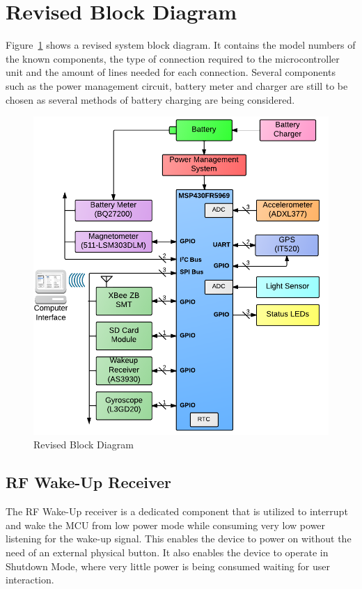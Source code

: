 \section{Revised Block Diagram}

Figure~\ref{fig:blockDiagram} shows a revised system block diagram.  It contains the model numbers of the known components, the type of connection required to the microcontroller unit and the amount of lines needed for each connection.  Several components such as the power management circuit, battery meter and charger are still to be chosen as several methods of battery charging are being considered.

\begin{figure}[H]
	\centering
	\includegraphics[width=\textwidth]{img/blockDiagramV2_2}
	\caption{Revised Block Diagram \label{fig:blockDiagram}}
\end{figure}

\subsection{RF Wake-Up Receiver}
The RF Wake-Up receiver is a dedicated component that is utilized to interrupt and wake the MCU from low power mode while consuming very low power listening for the wake-up signal. This enables the device to power on without the need of an external physical button. It also enables the device to operate in Shutdown Mode, where very little power is being consumed waiting for user interaction.

